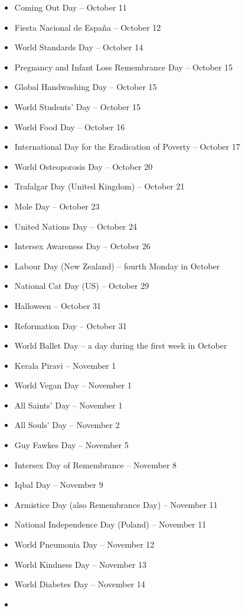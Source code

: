 \documentclass[
  openany]{book}
\begin{document}
\begin{itemize}
\item
  Coming Out Day -- October 11
\item
  Fiesta Nacional de España -- October 12
\item
  World Standards Day -- October 14
\item
  Pregnancy and Infant Loss Remembrance Day -- October 15
\item
  Global Handwashing Day -- October 15
\item
  World Students' Day -- October 15
\item
  World Food Day -- October 16
\item
  International Day for the Eradication of Poverty -- October 17
\item
  World Osteoporosis Day -- October 20
\item
  Trafalgar Day (United Kingdom) -- October 21
\item
  Mole Day -- October 23
\item
  United Nations Day -- October 24
\item
  Intersex Awareness Day -- October 26
\item
  Labour Day (New Zealand) -- fourth Monday in October
\item
  National Cat Day (US) -- October 29
\item
  Halloween -- October 31
\item
  Reformation Day -- October 31
\item
  World Ballet Day -- a day during the first week in October
\item
  Kerala Piravi -- November 1
\item
  World Vegan Day -- November 1
\item
  All Saints' Day -- November 1
\item
  All Souls' Day -- November 2
\item
  Guy Fawkes Day -- November 5
\item
  Intersex Day of Remembrance -- November 8
\item
  Iqbal Day -- November 9
\item
  Armistice Day (also Remembrance Day) -- November 11
\item
  National Independence Day (Poland) -- November 11
\item
  World Pneumonia Day -- November 12
\item
  World Kindness Day -- November 13
\item
  World Diabetes Day -- November 14
\item

\end{itemize}
\end{document}
